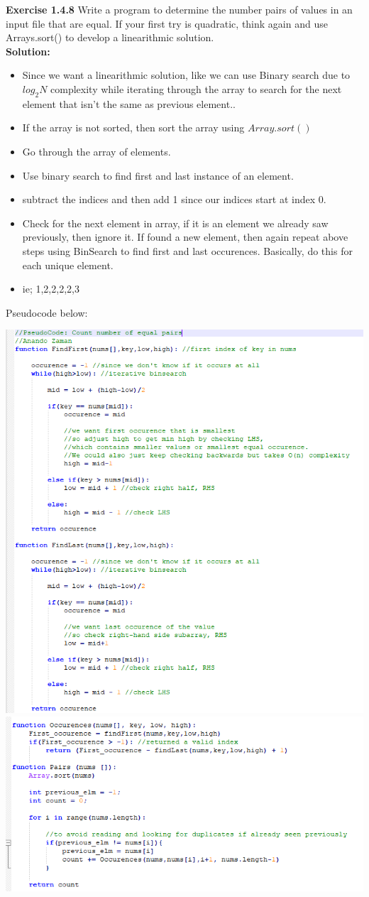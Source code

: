 \documentclass[11pt,fleqn]{article}
\begin{document}
\textbf{Exercise 1.4.8} Write a program to determine the number pairs of values in an input file that
are equal. If your first try is quadratic, think again and use Arrays.sort() to develop
a linearithmic solution.\\

\textbf{Solution:}
\begin{itemize}
	\item Since we want a linearithmic solution, like we can use Binary search due to $log_2N$ complexity while iterating through the array to search for the next element that isn't the same as previous element..
	\item If the array is not sorted, then sort the array using $Array.sort()$
	\item Go through the array of elements.
	\item Use binary search to find first and last instance of an element.
	\item subtract the indices and then add 1 since our indices start at index 0.
	\item Check for the next element in array, if it is an element we already saw previously, then ignore it. If found a new element, then again repeat above steps using BinSearch to find first and last occurences. Basically, do this for each unique element.
	\item ie; 1,2,2,2,2,3
	
\end{itemize}

\newpage
Pseudocode below:
\begin{center}
	\includegraphics[scale = 1]{1.4.8.png}
	\includegraphics[scale = 1]{1.4.8-1.png}
	\end{center}
\end{document}
